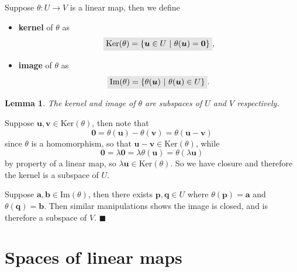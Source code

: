 \documentclass[letter-paper]{tufte-book}
\newtheorem{lemma}[theorem]{\color{pastel-blue}Lemma}
\newenvironment{proof}[1][Proof]{\begin{trivlist}
\item[\hskip \labelsep {\bfseries #1}]}{\end{trivlist}}
\newcommand{\ub}{{\boldsymbol{u}}}
\newcommand{\vb}{{\boldsymbol{v}}}
\newcommand{\qed}{\hfill$\blacksquare$}
\newcommand{\highlight}[1]{\mathchoice%
  {\colorbox{black!10}{$\displaystyle#1$}}%
  {\colorbox{black!10}{$\textstyle#1$}}%
  {\colorbox{black!10}{$\scriptstyle#1$}}%
  {\colorbox{black!10}{$\scriptscriptstyle#1$}}}%
\begin{document}
Suppose $\theta : U \to V$ is a linear map, then we define
\begin{itemize}
  \item \textbf{kernel} of $\theta$ as
  \begin{equation}
    \highlight{\mbox{Ker}(\theta) = \{\ub \in U\ |\ \theta(\ub) = \boldsymbol{0}\}},
  \end{equation}
  \item \textbf{image} of $\theta$ as
  \begin{equation}
    \highlight{\mbox{Im}(\theta) = \{\theta(\ub) \ |\ \theta(\ub) \in U\}}.
  \end{equation}
\end{itemize}

\begin{lemma}
  The kernel and image of $\theta$ are subspaces of $U$ and $V$ respectively.
\end{lemma}

\begin{proof}
  Suppose $\ub, \vb \in \mbox{Ker}(\theta)$, then note that
  \begin{equation*}
    \boldsymbol{0} = \theta(\ub) - \theta(\vb) = \theta(\ub - \vb)
  \end{equation*}
  since $\theta$ is a homomorphism, so that $\ub - \vb \in \mbox{Ker}(\theta)$,
  while
  \begin{equation*}
    \boldsymbol{0} = \lambda \boldsymbol{0} = \lambda \theta(\ub) = \theta(\lambda\ub)
  \end{equation*}
  by property of a linear map, so $\lambda\ub \in \mbox{Ker}(\theta)$. So we
  have closure and therefore the kernel is a subspace of $U$.
  
  Suppose $\boldsymbol{a}, \boldsymbol{b} \in \mbox{Im}(\theta)$, then there
  exists $\boldsymbol{p}, \boldsymbol{q} \in U$ where $\theta(\boldsymbol{p}) =
  \boldsymbol{a}$ and $\theta(\boldsymbol{q}) = \boldsymbol{b}$. Then similar
  manipulations shows the image is closed, and is therefore a subspace of $V$. \qed
\end{proof}


\section{Spaces of linear maps}
\end{document}
